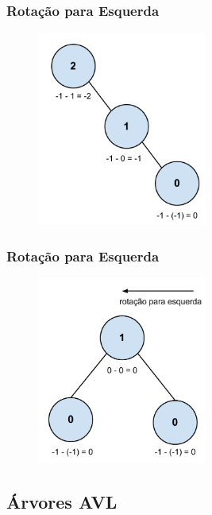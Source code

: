 \begin{frame}
    \frametitle{Rotação para Esquerda}
    
    \begin{figure}[tbp]
    \includegraphics[keepaspectratio=true,width=2.2in]{figs/fig_arvores/Balanceamento_Arvore4}
    \centering
    \end{figure}
\end{frame}

\begin{frame}
    \frametitle{Rotação para Esquerda}
    
    \begin{figure}[tbp]
    \includegraphics[keepaspectratio=true,width=2.2in]{figs/fig_arvores/Balanceamento_Arvore5}
    \centering
    \end{figure}
\end{frame}

\subsection{Árvores AVL}

